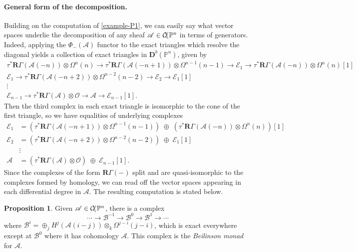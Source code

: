 \documentclass[a4paper]{article}
\theoremstyle{definition}
\newtheorem{prop}[defn]{Proposition}
\theoremstyle{remark}
\newcommand{\deri}{\mathbf{D}}
\newcommand{\Pn}{\ensuremath{{\mathbb{P}^n}}}
\DeclareMathOperator{\coh}{\mathcal{C\kern -2pt o\kern -2pt h\kern -1pt}}
\begin{document}
\paragraph{General form of the decomposition.} Building on the computation of
\cref{example-P1}, we can easily say what vector spaces underlie the
decomposition of any sheaf \(\mathscr{A}\in \coh\Pn\) in terms of generators. Indeed, applying the \(\Phi_{-}(\mathscr{A})\) functor to the exact triangles which resolve the diagonal yields a collection of exact triangles in \(\deri^b(\Pn)\), given by
\begin{gather*}
    \tau^\ast\mathbf{R}\Gamma(\mathscr{A}(-n))\otimes \Omega^n(n) \rightarrow
    \tau^\ast\mathbf{R}\Gamma(\mathscr{A}(-n+1))\otimes \Omega^{n-1}(n-1)
    \rightarrow \mathscr{E}_1 \rightarrow
    \tau^\ast\mathbf{R}\Gamma(\mathscr{A}(-n))\otimes \Omega^n(n) [1] \\ 
    \mathscr{E}_1 \rightarrow
    \tau^\ast\mathbf{R}\Gamma(\mathscr{A}(-n+2))\otimes \Omega^{n-2}(n-2) \rightarrow
    \mathscr{E}_2 \rightarrow 
    \mathscr{E}_1[1] \\ 
    \vdots \\
    \mathscr{E}_{n-1} \rightarrow
    \tau^\ast\mathbf{R}\Gamma(\mathscr{A})\otimes \mathscr{O} \rightarrow
    \mathscr{A} \rightarrow 
    \mathscr{E}_{n-1}[1].
\end{gather*}
Then the third complex in each exact triangle is isomorphic to the cone of the
first triangle, so we have equalities of underlying complexes
\begin{align*}
    \mathscr{E}_1 &=  (\tau^\ast\mathbf{R}\Gamma (\mathscr{A}(-n+1))\otimes
    \Omega^{n-1}(n-1))
    \;\oplus \;  (\tau^\ast\mathbf{R}\Gamma (\mathscr{A}(-n))\otimes
    \Omega^n(n))[1]  \\ \mathscr{E}_2 &= (\tau^\ast\mathbf{R}\Gamma
    (\mathscr{A}(-n+2)) \otimes  \Omega^{n-2}(n-2)) \;\oplus\; \mathscr{E}_1[1] \\
                                     &\vdots \\ \mathscr{A} &= (\tau^\ast \mathbf{R}\Gamma(\mathscr{A})\otimes
    \mathscr{O}) \;\oplus \; \mathscr{E}_{n-1}[1].
\end{align*}
Since the complexes of the form \(\mathbf{R}\Gamma(-)\) split and are
quasi-isomorphic to the complexes formed by homology, we can read off the vector
spaces appearing in each differential degree in \(\mathscr{A}\). The resulting
computation is stated below.

\begin{prop}
    Given \(\mathscr{A}\in \coh\Pn\), there is a complex 
    \[\cdots\rightarrow \mathscr{B}^{-1} \rightarrow \mathscr{B}^0 \rightarrow
    \mathscr{B}^1 \rightarrow \cdots  \]
    where \(\mathscr{B}^i=\oplus_j H^{j}(\mathscr{A}(i-j))\otimes_k
    \Omega^{j-i}(j-i)\), which is exact everywhere except at \(\mathscr{B^0}\)
    where it has cohomology \(\mathscr{A}\). This complex is the
    \textit{Beilinson monad} for \(\mathscr{A}\).
    \label{beilinsonmonad}
\end{prop}
\end{document}
